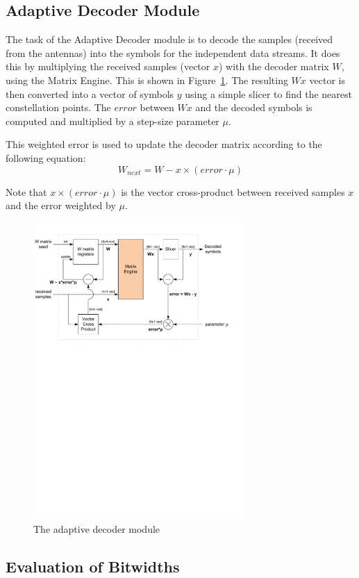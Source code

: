 \documentclass[journal]{IEEEtran}
\begin{document}
\subsection{Adaptive Decoder Module}

The task of the Adaptive Decoder module is to decode the samples (received from the antennas) into the symbols for the independent data streams. It does this by multiplying the received samples (vector $x$) with the decoder matrix $W$, using the Matrix Engine. This is shown in Figure~\ref{adaptive_decoder}. The resulting $Wx$ vector is then converted into a vector of symbols $y$ using a simple slicer to find the nearest constellation points. The $error$ between $Wx$ and the decoded symbols is computed and multiplied by a step-size parameter $\mu$.

This weighted error is used to update the decoder matrix according to the following equation:
\[ W_{next} = W - x \times (error \cdot \mu) \]

Note that $x \times (error \cdot \mu)$ is the vector cross-product between received samples $x$ and the error weighted by $\mu$.
\begin{figure}[!h]
\centering
\includegraphics*[width=8cm, viewport = 0 510 560 810]{images/adaptive_decoder.pdf}
\caption{The adaptive decoder module}
\label{adaptive_decoder}
\end{figure}

\subsection{Evaluation of Bitwidths}
\end{document}
